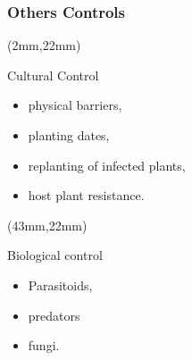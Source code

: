 \begin{frame}
	\frametitle{Others Controls}
	{
		\begin{textblock*}{40mm}(2mm,22mm)	
			\begin{graybox}{Cultural Control}
				\begin{itemize}
					\item<1-> physical barriers,
					\item<2-> planting dates,
					\item<3->\textcolor{redstrong}{replanting of infected plants},
					\item<4-> host plant resistance.
				\end{itemize}
			\end{graybox}
		\end{textblock*}
	}
	{
		\begin{textblock*}{40mm}(43mm,22mm)
			\begin{graybox}{Biological control}
				\begin{itemize}
					\item<5-> Parasitoids,
					\item<6-> predators
					\item<7-> fungi.
				\end{itemize}
			\end{graybox}
		\end{textblock*}
	}
\end{frame}

